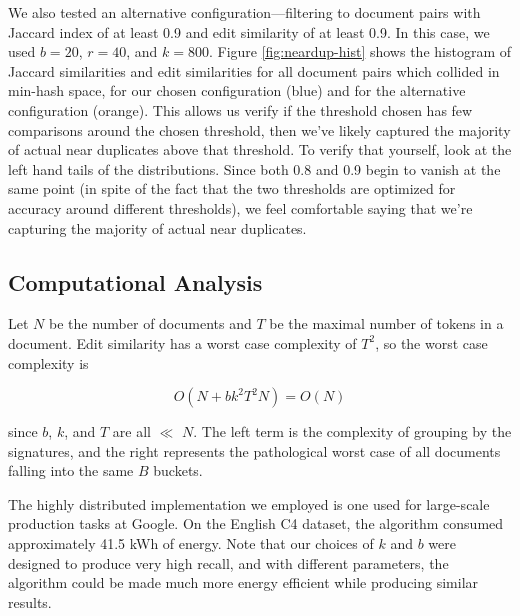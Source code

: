 We also tested an alternative configuration---filtering to document pairs with Jaccard index of at least 0.9 and edit similarity of at least 0.9.
In this case, we used $b=20$, $r=40$, and $k=800$.
Figure \ref{fig:neardup-hist} shows the histogram of Jaccard similarities and edit similarities for all document pairs which collided in min-hash space, for our chosen configuration (blue) and for the alternative configuration (orange).
This allows us verify if the threshold chosen has few comparisons around the chosen threshold, then we've likely captured the majority of actual near duplicates above that threshold. To verify that yourself, look at the left hand tails of the distributions. Since both 0.8 and 0.9 begin to vanish at the same point (in spite of the fact that the two thresholds are optimized for accuracy around different thresholds), we feel comfortable saying that we're capturing the majority of actual near duplicates. 


\subsection{Computational Analysis}

Let $N$ be the number of documents and $T$ be the maximal number of tokens in a document. Edit similarity has a worst case complexity of $T^2$, so the worst case complexity is

\begin{equation}
    O(N + b k^{2} T^{2} N) = O(N)
\end{equation}

\noindent since $b$, $k$, and $T$ are all $\ll$ $N$. The left term is the complexity of grouping by the signatures, and the right represents the pathological worst case of all documents falling into the same $B$ buckets.

The highly distributed \Approx{} implementation we employed is one used for large-scale production tasks at Google.
On the English C4 dataset, the algorithm consumed approximately 41.5 kWh of energy.
Note that our choices of $k$ and $b$ were designed to produce very high recall, and with different parameters, the algorithm could be made much more energy efficient while producing similar results.



